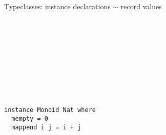 \documentclass[aspectratio=169]{beamer}
\begin{document}
\begin{frame}[fragile]{Typeclasses: instance declarations $\sim$ record values}

\begin{minipage}{.53\textwidth}%
\begin{code}%
\>[0]\<%
\\
\>[0][@{}l@{\AgdaIndent{0}}]%
\>[2]\AgdaSpace{}%
\AgdaSymbol{:}\AgdaSpace{}%
\AgdaSpace{}%
\<%
\\
%
\>[2]\AgdaSpace{}%
\AgdaSymbol{=}\AgdaSpace{}%
\AgdaSpace{}%
\<%
\\
\>[2][@{}l@{\AgdaIndent{0}}]%
\>[4]%
\>[18]\AgdaSpace{}%
\<%
\\
%
\>[4]\AgdaSpace{}%
\AgdaSpace{}%
%
\>[18]\AgdaSpace{}%
\AgdaSpace{}%
\AgdaOperator{\AgdaField{+}}\AgdaSpace{}%
\<%
\\
%
\>[4]%
\>[21]\AgdaSpace{}%
\<%
\\
%
\>[4]%
\>[21]\AgdaSpace{}%
\<%
\\
%
\>[4]%
\>[21]\AgdaSpace{}%
\<%
\\
\>[0]\AgdaSymbol{\{-\#}\AgdaSpace{}%
\AgdaSpace{}%
\AgdaSpace{}%
\AgdaSpace{}%
\AgdaSymbol{\#-\}}\<%
\end{code}
\end{minipage}\hspace{-.5cm}\vrule\hspace{.2cm}
\begin{minipage}{.45\textwidth}%
\begin{verbatim}
instance Monoid Nat where
  mempty = 0
  mappend i j = i + j
\end{verbatim}
\end{minipage}

\end{frame}
\end{document}
